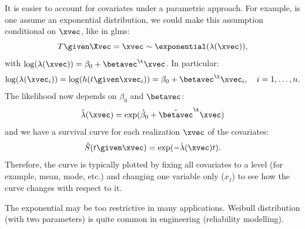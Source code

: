 It is easier to account for covariates under a parametric approach. For example, is one assume an exponential distribution, we could make this assumption conditional on $\xvec$, like in \acsp{glm}:
\begin{equation}
    T \given \Xvec = \xvec \sim \exponential(\lambda(\xvec)),
\end{equation}
with $\log(\lambda(\xvec)) = \beta_0 + \betavec^\t\xvec$. In particular:
\begin{equation}
    \log(\lambda(\xvec_i)) = \log(h(t \given \xvec_i)) = \beta_0 + \betavec^\t\xvec_i, \quad i = 1, \ldots, n.
\end{equation}
The likelihood now depends on $\beta_0$ and $\betavec$:
\begin{equation}
    \hat{\lambda}(\xvec) = \exp(\hat{\beta}_0 + \hat{\betavec}^\t\xvec)
\end{equation}
and we have a survival curve for each realization $\xvec$ of the covariates:
\begin{equation}
    \hat{S}(t \given \xvec) = \exp(-\hat{\lambda}(\xvec) t).
\end{equation}
Therefore, the curve is typically plotted by fixing all covariates to a level (for example, mean, mode, etc.) and changing one variable only ($x_j$) to see how the curve changes with respect to it.

\begin{note}
    The exponential may be too restrictive in many applications. Weibull distribution (with two parameters) is quite common in engineering (reliability modelling).
\end{note}